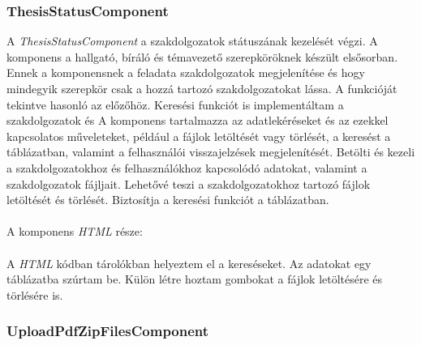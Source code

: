 \subsubsection{ThesisStatusComponent}

A \textit{ThesisStatusComponent} a szakdolgozatok státuszának kezelését végzi. A komponens a hallgató, bíráló és témavezető szerepköröknek készült elsősorban. Ennek a komponensnek a feladata szakdolgozatok megjelenítése és hogy mindegyik szerepkör csak a hozzá tartozó szakdolgozatokat lássa. A funkcióját tekintve hasonló az előzőhöz. Keresési funkciót is implementáltam a szakdolgozatok és  A komponens tartalmazza az adatlekéréseket és az ezekkel kapcsolatos műveleteket, például a fájlok letöltését vagy törlését, a keresést a táblázatban, valamint a felhasználói visszajelzések megjelenítését. Betölti és kezeli a szakdolgozatokhoz és felhasználókhoz kapcsolódó adatokat, valamint a szakdolgozatok fájljait. Lehetővé teszi a szakdolgozatokhoz tartozó fájlok letöltését és törlését. Biztosítja a keresési funkciót a táblázatban.\\
\\
A komponens \textit{HTML} része:\\
\\
A \textit{HTML} kódban tárolókban helyeztem el a kereséseket. Az adatokat egy táblázatba szúrtam be. Külön létre hoztam gombokat a fájlok letöltésére és törlésére is.

\subsubsection{UploadPdfZipFilesComponent}

